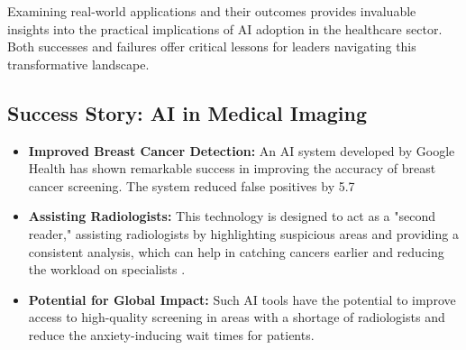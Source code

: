 Examining real-world applications and their outcomes provides invaluable insights into the practical implications of AI adoption in the healthcare sector. Both successes and failures offer critical lessons for leaders navigating this transformative landscape.

\subsection{Success Story: AI in Medical Imaging}
\begin{itemize}
    \item \textbf{Improved Breast Cancer Detection:} An AI system developed by Google Health has shown remarkable success in improving the accuracy of breast cancer screening. The system reduced false positives by 5.7%
    \item \textbf{Assisting Radiologists:} This technology is designed to act as a "second reader," assisting radiologists by highlighting suspicious areas and providing a consistent analysis, which can help in catching cancers earlier and reducing the workload on specialists \cite{HealthGoogle_GoogleHealth}.
    \item \textbf{Potential for Global Impact:} Such AI tools have the potential to improve access to high-quality screening in areas with a shortage of radiologists and reduce the anxiety-inducing wait times for patients.
\end{itemize}

